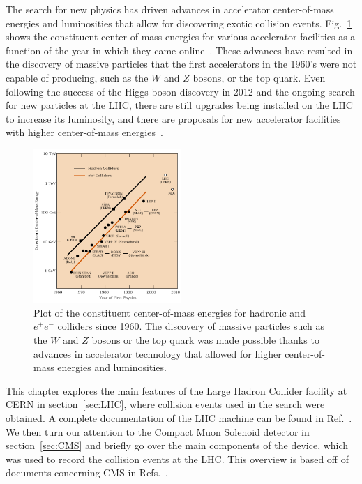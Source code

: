 The search for new physics has driven advances in accelerator center-of-mass energies and luminosities that allow for discovering exotic collision events.
Fig.~\ref{fig:ECMplot} shows the constituent center-of-mass energies for various accelerator facilities as a function of the year in which they came online~\cite{Panofsky}.
These advances have resulted in the discovery of massive particles that the first accelerators in the 1960's were not capable of producing, such as the $W$ and $Z$ bosons, or the top quark. %
Even following the success of the Higgs boson discovery in 2012 and the ongoing search for new particles at the LHC, there are still upgrades being installed on the LHC to increase its luminosity, and there are proposals for new accelerator facilities with higher center-of-mass energies~\cite{Bicer_2014}.

\begin{figure}[htbp]
  \centering
  \includegraphics[width=0.5\textwidth]{fig/experiment/ecm_livingston.pdf}
  \caption{
    Plot of the constituent center-of-mass energies for hadronic and $e^+e^-$ colliders since 1960.
    The discovery of massive particles such as the $W$ and $Z$ bosons or the top quark was made possible thanks to advances in accelerator technology that allowed for higher center-of-mass energies and luminosities.
  }
  \label{fig:ECMplot}
\end{figure}

This chapter explores the main features of the Large Hadron Collider facility at CERN in section~\ref{sec:LHC}, where collision events used in the search were obtained.
A complete documentation of the LHC machine can be found in Ref.~\cite{Evans:1129806}.
We then turn our attention to the Compact Muon Solenoid detector in section~\ref{sec:CMS} and briefly go over the main components of the device, which was used to record the collision events at the LHC.
This overview is based off of documents concerning CMS in Refs.~\cite{Chatrchyan:1129810,taylor_2011}.

